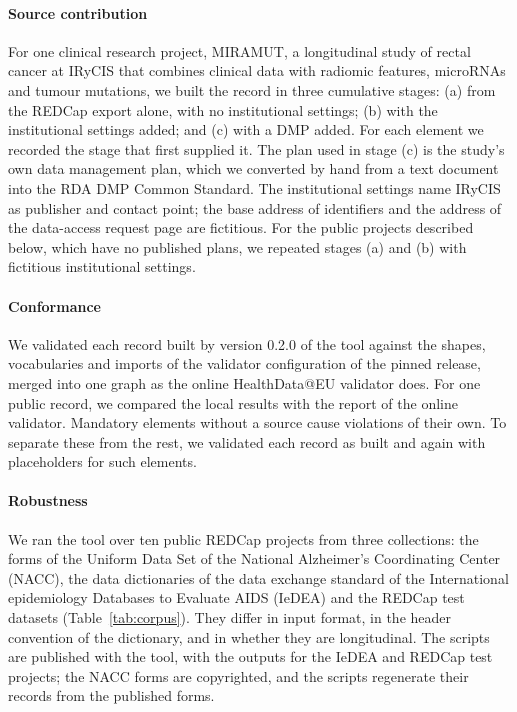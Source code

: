 \documentclass[12pt]{article}
\begin{document}
\paragraph{Source contribution} For one clinical research project, MIRAMUT, a longitudinal study of rectal cancer at
IRyCIS that combines clinical data with radiomic features, microRNAs and tumour
mutations, we built the record in three cumulative stages:
(a) from the REDCap export alone, with no institutional settings; (b) with the
institutional settings added; and (c) with a DMP added. For each element we recorded the
stage that first supplied it. The plan used in stage (c) is the study's own data management plan, which we converted
by hand from a text document into the RDA DMP Common Standard. The institutional
settings name IRyCIS as publisher and contact point; the base address of identifiers and
the address of the data-access request page are fictitious. For the public projects
described below, which have no published plans, we repeated stages (a) and (b) with
fictitious institutional settings.

\paragraph{Conformance} We validated each record built by version 0.2.0 of the tool
against the shapes, vocabularies and
imports of the validator configuration of the pinned release, merged into one graph as
the online HealthData@EU validator does. For one public record, we compared the local results with the report of the online validator. Mandatory
elements without a source cause violations of their own. To separate these from the
rest, we validated each record as built and again with placeholders for such elements.

\paragraph{Robustness} We ran the tool over ten public REDCap projects from three
collections: the forms of the Uniform Data Set of the National Alzheimer's Coordinating
Center (NACC),\citep{naccuds} the data dictionaries of the data exchange standard of the International
epidemiology Databases to Evaluate AIDS (IeDEA)\citep{iedeadict} and the REDCap test datasets\citep{redcaptestdata}
(Table~\ref{tab:corpus}). They differ in input format, in the header convention of the
dictionary, and in whether they are longitudinal. The scripts are published with the tool, with the outputs for the IeDEA and REDCap
test projects; the NACC forms are copyrighted, and the scripts regenerate their records
from the published forms.
\end{document}
